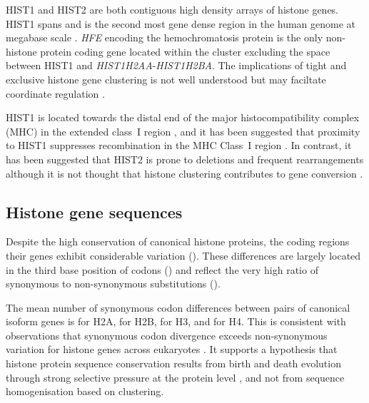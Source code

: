 	HIST1 and HIST2 are both contiguous high density arrays of histone genes. 
	HIST1 spans \HISTOneSpan{} 
	and is the second most gene dense region in the human genome at megabase scale \citep{MHC-III-analysis}.
	\textit{HFE} encoding the hemochromatosis protein \citep{AlbigDoenecke1998} 
	is the only non-histone protein coding gene located within the cluster
	excluding the space between HIST1 and \textit{HIST1H2AA}-\textit{HIST1H2BA}. 
	The implications of tight and exclusive histone gene clustering 
	is not well understood but may faciltate coordinate regulation \citep{Eirinlopez2009,close-regulators}.

	HIST1 is located towards the distal end of the major histocompatibility complex (MHC) 
	in the extended class~I region \citep{MHC-I-transcript, MHC-complete-sequencing-1999}, 
	and it has been suggested that proximity to HIST1 
	suppresses recombination in the MHC Class~I region \citep{MHC-repressed-by-HIST}. 
	In contrast, it has been suggested that HIST2 is prone to 
	deletions and frequent rearrangements \citep{HISTTwo-prone-deletion-discovery, HISTTwo-prone-deletion-focus}
	although it is not thought that histone clustering contributes to gene conversion \citep{NeiRooney2005}.

\subsection{Histone gene sequences}
	Despite the high conservation of canonical histone proteins, 
	the coding regions their genes exhibit considerable variation (). 
	These differences are largely located in the third base position of codons ()
	and reflect the very high ratio of synonymous to non-synonymous substitutions ().

	The mean number of synonymous codon differences between pairs of canonical isoform genes is 
	 for H2A, 
	 for H2B, 
	 for H3, 
	and  for H4.
	This is consistent with observations that 
	synonymous codon divergence exceeds non-synonymous variation 
	for histone genes across eukaryotes \citep{Piontkivska2002, Rooney2002}. 
	It supports a hypothesis that histone protein sequence conservation 
	results from birth and death evolution through strong selective pressure at the protein level \citep{NeiRooney2005}, 
	and not from sequence homogenisation based on clustering.

